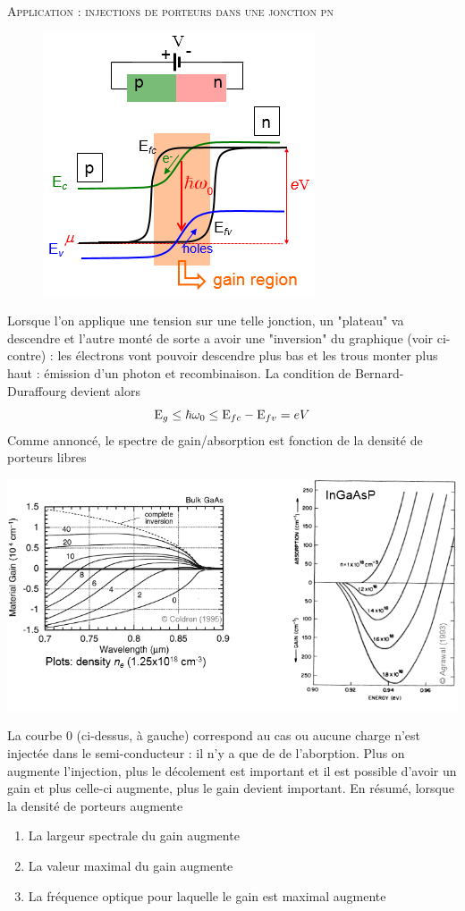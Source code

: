 	\textsc{Application : injections de porteurs dans une jonction pn}\\
	\begin{figure}
	\vspace{-5mm}
	\includegraphics[scale=0.5]{ch5/image28}
	\end{figure}
	Lorsque l'on applique une tension sur une telle jonction, un "plateau" va descendre et l'autre 
	monté de sorte a avoir une "inversion" du graphique (voir ci-contre) : les électrons vont pouvoir
	descendre plus bas et les trous monter plus haut : émission d'un photon et recombinaison. La 
	condition de Bernard-Duraffourg devient alors 
	\begin{equation}
	{{\rm{E}}_g} \le \hbar {\omega _0} \le {{\rm{E}}_{fc}} - {{\rm{E}}_{fv}} = eV
	\end{equation}
	Comme annoncé, le spectre de gain/absorption est fonction de la densité de porteurs libres
	\begin{center}
	\includegraphics[scale=0.35]{ch5/image29}
	\end{center}
	La courbe 0 (ci-dessus, à gauche) correspond au cas ou aucune charge n'est injectée dans le 
	semi-conducteur : il  n'y a que de de l'aborption. Plus on augmente l'injection, plus le 
	décolement est important et il est possible d'avoir un gain et plus celle-ci augmente, plus 
	le gain devient important. En résumé, lorsque la densité de porteurs augmente
	\begin{enumerate}
	\item La largeur spectrale du gain augmente
	\item La valeur maximal du gain augmente
	\item La fréquence optique pour laquelle le gain est maximal augmente
	\end{enumerate}
	


